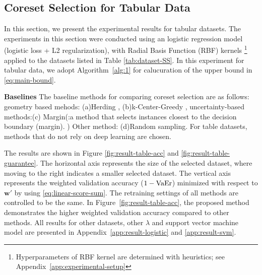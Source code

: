 	\subsection{Coreset Selection for Tabular Data}
	\label{subsec:result-table}

	In this section, we present the experimental results for tabular datasets.
	The experiments in this section were conducted using an logistic regression model (logistic loss + L2 regularization), with Radial Basis Function (RBF) kernels
	\footnote{Hyperparameters of RBF kernel are determined with heuristics; see Appendix~\ref{app:experimental-setup}} \citep{scholkopf2001generalized} applied to the datasets listed in Table \ref{tab:dataset-SS}.
	In this experiment for tabular data, we adopt Algorithm~\ref{alg:1} for calucuration of the upper bound in \eqref{eq:main-bound}.

	{\bf Baselines} The baseline methods for comparing coreset selection are as follows:
	geometry based mehods: (a)Herding \citep{welling2009herding}, (b)k-Center-Greedy \citep{sener2017active}, uncertainty-based methods:(c) Margin(:a method that selects instances closest to the decision boundary (margin).
	) Other method: (d)Random sampling.
	For table datasets, methods that do not rely on deep learning are chosen.

	The results are shown in Figure \ref{fig:result-table-acc} and \ref{fig:result-table-guarantee}. The horizontal axis represents the size of the selected dataset, where moving to the right indicates a smaller selected dataset.
	The vertical axis represents the weighted validation accuracy ($1-{\rm VaEr}$) minimized with respect to $\bm w'$ by using \eqref{eq:linear-score-sum}.
	The retraining settings of all methods are controlled to be the same.
	In Figure~\ref{fig:result-table-acc}, the proposed method demonstrates the higher weighted validation accuracy compared to other methods.
	All results for other datasets, other $\lambda$ and support vector machine model are presented in Appendix~\ref{app:result-logistic} and \ref{app:result-svm}.

